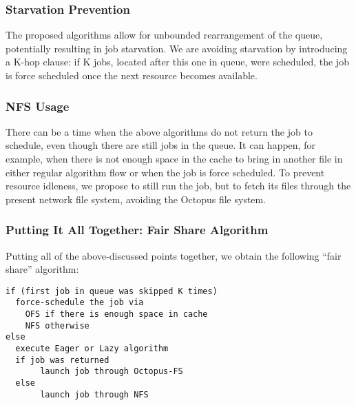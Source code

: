 \subsubsection{\label{sec:Starvation}Starvation Prevention}
The proposed algorithms allow for unbounded rearrangement of the queue, potentially resulting in job starvation. We are avoiding starvation by introducing a K-hop clause: if K jobs, located after this one in queue, were scheduled, the job is force scheduled once the next resource becomes available.
\subsubsection{\label{sec:NFSUsage}NFS Usage}
There can be a time when the above algorithms do not return the job to schedule, even though there are still jobs in the queue. It can happen, for example, when there is not enough space in the cache to bring in another file in either regular algorithm flow or when the job is force scheduled. To prevent resource idleness, we propose to still run the job, but to fetch its files through the present network file system, avoiding the Octopus file system.
\subsubsection{\label{sec:Together}Putting It All Together: Fair Share Algorithm}
Putting all of the above-discussed points together, we obtain the following ``fair share'' algorithm: \begin{verbatim}
if (first job in queue was skipped K times)
  force-schedule the job via 
    OFS if there is enough space in cache
    NFS otherwise
else
  execute Eager or Lazy algorithm
  if job was returned
       launch job through Octopus-FS
  else
       launch job through NFS
\end{verbatim}

